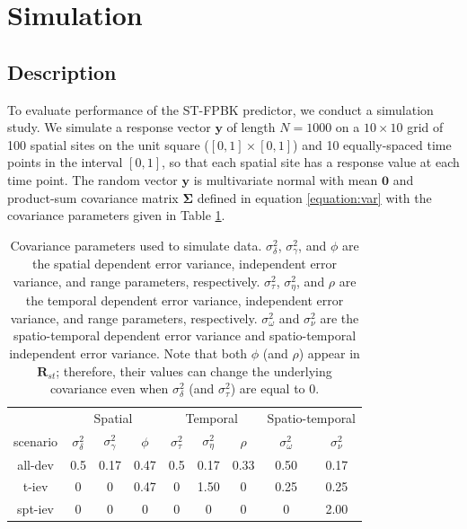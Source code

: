 \documentclass[]{article}    %
\begin{document}
\hypertarget{section:Simulation}{%
\section{Simulation}\label{section:Simulation}}

\hypertarget{description}{%
\subsection{Description}\label{description}}

To evaluate performance of the ST-FPBK predictor, we conduct a
simulation study. We simulate a response vector \(\mathbf{y}\) of length
\(N = 1000\) on a \(10 \times 10\) grid of 100 spatial sites on the unit
square (\([0, 1] \times [0, 1]\)) and 10 equally-spaced time points in
the interval \([0, 1]\), so that each spatial site has a response value
at each time point. The random vector \(\mathbf{y}\) is multivariate
normal with mean \(\mathbf{0}\) and product-sum covariance matrix
\(\bm{\Sigma}\) defined in equation \ref{equation:var} with the
covariance parameters given in Table \ref{tab:simparmtab}.

\begin{table}[H]

\caption{\label{tab:simparmtab}Covariance parameters used to simulate data. $\sigma^2_{\delta}$, $\sigma^2_{\gamma}$, and $\phi$ are the spatial dependent error variance, independent error variance, and range parameters, respectively. $\sigma^2_{\tau}$, $\sigma^2_{\eta}$, and $\rho$ are the temporal dependent error variance, independent error variance, and range parameters, respectively. $\sigma^2_{\omega}$ and $\sigma^2_{\nu}$ are the spatio-temporal dependent error variance and spatio-temporal independent error variance. Note that both $\phi$ (and $\rho$) appear in $\mathbf{R}_{st}$; therefore, their values can change the underlying covariance even when $\sigma^2_{\delta}$ (and $\sigma^2_{\tau}$) are equal to 0.}
\centering
\begin{tabular}[t]{ccccccccc}
\toprule
\multicolumn{1}{c}{ } & \multicolumn{3}{c}{Spatial} & \multicolumn{3}{c}{Temporal} & \multicolumn{2}{c}{Spatio-temporal} \\
\cmidrule(l{3pt}r{3pt}){2-4} \cmidrule(l{3pt}r{3pt}){5-7} \cmidrule(l{3pt}r{3pt}){8-9}
scenario & $\sigma^2_{\delta}$ & $\sigma^2_{\gamma}$ & $\phi$ & $\sigma^2_{\tau}$ & $\sigma^2_{\eta}$ & $\rho$ & $\sigma^2_{\omega}$ & $\sigma^2_{\nu}$\\
\midrule
all-dev & 0.5 & 0.17 & 0.47 & 0.5 & 0.17 & 0.33 & 0.50 & 0.17\\
t-iev & 0 & 0 & 0.47 & 0 & 1.50 & 0 & 0.25 & 0.25\\
spt-iev & 0 & 0 & 0 & 0 & 0 & 0 & 0 & 2.00\\
\bottomrule
\end{tabular}
\end{table}
\end{document}
